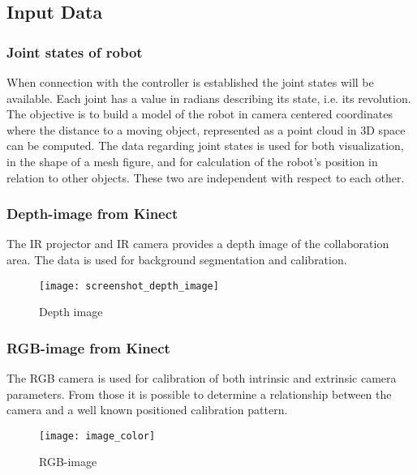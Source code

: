 \subsection{Input Data}
\subsubsection{Joint states of robot}
When connection with the controller is established the joint states will be available. Each joint has a value in radians describing its state, i.e. its revolution. The objective is to build a model of the robot in camera centered coordinates where the distance to a moving object, represented as a point cloud in 3D space can be computed.
The data regarding joint states is used for both visualization, in the shape of a mesh figure, and for calculation of the robot's position in relation to other objects. These two are independent with respect to each other.

\subsubsection{Depth-image from Kinect}
The IR projector and IR camera provides a depth image of the collaboration area. The data is used for background segmentation and calibration. 

\begin{figure}[H]
\begin{center}
\texttt{[image: screenshot\_depth\_image]}
\caption{Depth image}

\end{center}
\end{figure}

\subsubsection{RGB-image from Kinect}
The RGB camera is used for calibration of both intrinsic and extrinsic camera parameters. From those it is possible to determine a relationship between the camera and a well known positioned calibration pattern. 

\begin{figure}[H]
\begin{center}
\texttt{[image: image\_color]}
\caption{RGB-image}

\end{center}
\end{figure}
